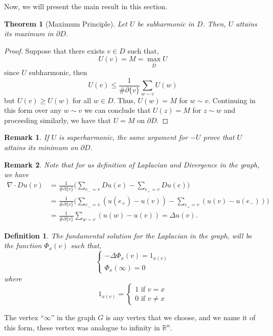 \documentclass{article}
\newtheorem{theorem}{Theorem}
\newtheorem{remark}{Remark}
\newtheorem{definition}{Definition}
\begin{document}
Now, we will present the main result in this section.
\begin{theorem}[Maximum Principle]
	Let $U$ be subharmonic in $D$. Then, $U$ attains its maximum in $\partial D$.
\end{theorem}
\begin{proof}
	Suppose that there exists $v\in D$ such that, 
	\[
	  U(v)=M=\max \limits_{\overline{D}}U
	\]
	since $U$ subharmonic, then
	\[
	  U(v)\leq \frac{1}{\#\partial \{v\}}\sum \limits_{w\sim v}U(w)
	\]
	but $U(v)\geq U(w)$ for all $w\in D$. Thus, $U(w)=M$ for $w\sim v$. Continuing in this form over any $w\sim v$ we can conclude that $U(z)=M$ for $z\sim w$ and proceeding similarly, we have that $U=M$ on $\partial D$.
\end{proof}
\begin{remark}
	If $U$ is superharmonic, the same argument for $-U$ prove that $U$ attains its minimum on $\partial D$.
\end{remark}

\begin{remark}
    Note that for us definition of Laplacian and Divergence in the graph, we have 
\begin{align*}
\nabla\cdot Du(v)&=\frac{1}{\#\partial\{v\}}\bigg(\sum \limits_{e_-=v}Du(e)-\sum \limits_{e_+=v}Du(e)\bigg)\\
&= \frac{1}{\#\partial\{v\}}\bigg(\sum \limits_{e_-=v}(u(e_+)-u(v))-\sum \limits_{e_+=v}(u(v)-u(e_-))\bigg)\\
&=\frac{1}{\#\partial \{v\}}\sum \limits_{w\sim v}(u(w)-u(v))=\Delta u(v).
\end{align*}
\end{remark}

\begin{definition}
	The fundamental solution for the Laplacian in the graph, will be the function $\Phi_x(v)$ such that, 
	\begin{equation*}
	\begin{cases}
	-\Delta \Phi_x(v)=1_{x(v)}\\
	\Phi_x(\infty)=0
	\end{cases}
	\end{equation*}
	where 
	\begin{equation*}
	1_{x(v)}=
	\begin{cases}
	1 \text{ if } v=x\\
	0 \text{ if } v\neq x
	\end{cases}
	\end{equation*}
\end{definition}
 The vertex ``$\infty$'' in the graph $G$ is any vertex that we choose, and we name it of this form, these vertex was analogue to infinity in $\mathbb{R}^n$.
 
\end{document}
